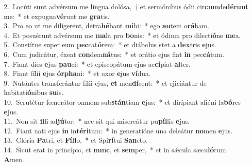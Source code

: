 {2.~}Locúti sunt advérsum me lingua dolósa,~† et sermónibus ódii cir\textbf{cum}de\textbf{dé}\textbf{runt} me:~* et expugna\textbf{vé}runt me \textbf{gra}tis.\\
{3.~}Pro eo ut me dilígerent, detra\textbf{hé}bant \textbf{mi}hi:~* ego \textbf{au}tem o\textbf{rá}bam.\\
{4.~}Et posuérunt advérsum me \textbf{ma}la pro \textbf{bo}nis:~* et ódium pro dilecti\textbf{ó}ne \textbf{me}a.\\
{5.~}Constítue super eum \textbf{pec}ca\textbf{tó}rem:~* et diábolus stet a \textbf{dex}tris \textbf{e}jus.\\
{6.~}Cum judicátur, éxeat \textbf{con}dem\textbf{ná}tus:~* et orátio ejus fiat \textbf{in} pec\textbf{cá}tum.\\
{7.~}Fiant dies \textbf{e}jus \textbf{pau}ci:~* et episcopátum ejus ac\textbf{cí}piat \textbf{al}ter.\\
{8.~}Fiant fílii \textbf{e}jus \textbf{ór}\textbf{pha}ni:~* et uxor \textbf{e}jus \textbf{ví}dua.\\
{9.~}Nutántes transferántur fílii ejus, \textbf{et} men\textbf{dí}cent:~* et ejiciántur de habitati\textbf{ó}nibus \textbf{su}is.\\
{10.~}Scrutétur fœnerátor omnem sub\textbf{stán}tiam \textbf{e}jus:~* et dirípiant aliéni la\textbf{bó}res \textbf{e}jus.\\
{11.~}Non sit \textbf{il}li ad\textbf{jú}tor:~* nec sit qui misereátur pu\textbf{píl}lis \textbf{e}jus.\\
{12.~}Fiant nati ejus \textbf{in} in\textbf{té}\textbf{ri}tum:~* in generatióne una deleátur \textbf{no}men \textbf{e}jus.\\
{13.~}Glória \textbf{Pa}tri, et \textbf{Fí}\textbf{li}o,~* et Spi\textbf{rí}tui \textbf{San}cto.\\
{14.~}Sicut erat in princípio, et \textbf{nunc}, et \textbf{sem}per,~* et in sǽcula sæcu\textbf{ló}rum. \textbf{A}men.\\
